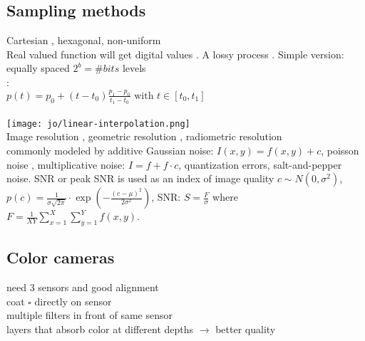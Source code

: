 \subsection*{Sampling methods}
Cartesian , hexagonal, non-uniform\\
 Real valued function will get digital values . A lossy process . Simple version: equally spaced $2^b = \#bits$ levels\\
: \\
$p(t) = p_0 + (t - t_0)\frac{p_1 - p_0}{t_1 - t_0} \text{ with } t \in [t_0, t_1]$ \\
     \\
\texttt{[image: jo/linear-interpolation.png]} \\ 
 Image resolution , geometric resolution , radiometric resolution \\
 commonly modeled by additive Gaussian noise: $I(x, y) = f(x, y) + c$, poisson noise , multiplicative noise: $I = f + f \cdot c$, quantization errors, salt-and-pepper noise. SNR or peak SNR is used as an index of image quality $c \sim N(0, \sigma^2)$, $p(c) = \frac{1}{\sigma \sqrt{2\pi}} \cdot \exp\left(-\frac{(c - \mu)^2}{2\sigma^2}\right)$, SNR: $S = \frac{F}{\sigma}$ where $F = \frac{1}{XY}\sum_{x = 1}^X \sum_{y = 1}^{Y} f(x, y)$.
\subsection*{Color cameras}
 need 3 sensors and good alignment\\
 coat $\square$ directly on sensor \\
 multiple filters in front of same sensor\\
 layers that absorb color at different depths $\rightarrow$ better quality